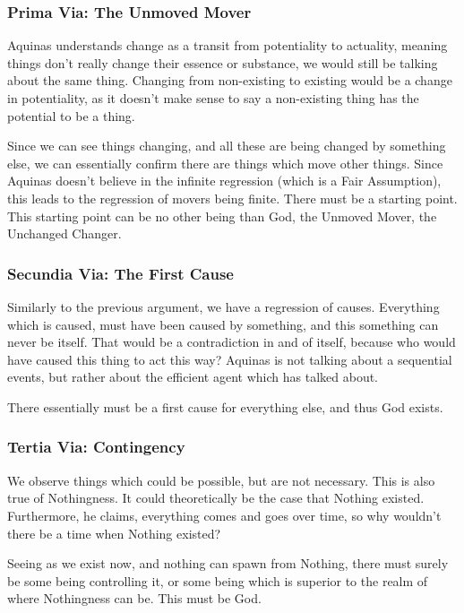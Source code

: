 \documentclass{article}
\begin{document}
	\subsubsection*{Prima Via: The Unmoved Mover}
	Aquinas understands change as a transit from potentiality to actuality, meaning things don't really change their essence or substance, we would still be talking about the same thing. Changing from non-existing to existing would be a change in potentiality, as it doesn't make sense to say a non-existing thing has the potential to be a thing.

	Since we can see things changing, and all these are being changed by something else, we can essentially confirm there are things which move other things. Since Aquinas doesn't believe in the infinite regression (which is a Fair Assumption), this leads to the regression of movers being finite. There must be a starting point. This starting point can be no other being than God, the Unmoved Mover, the Unchanged Changer.
	

	\subsubsection*{Secundia Via: The First Cause}
	Similarly to the previous argument, we have a regression of causes. Everything which is caused, must have been caused by something, and this something can never be itself. That would be a contradiction in and of itself, because who would have caused this thing to act this way? Aquinas is not talking about a sequential events, but rather about the efficient agent which \citeauthor{aristotlecauses} has talked about.

	There essentially must be a first cause for everything else, and thus God exists.


	\subsubsection*{Tertia Via: Contingency}
	We observe things which could be possible, but are not necessary. This is also true of Nothingness. It could theoretically be the case that Nothing existed. Furthermore, he claims, everything comes and goes over time, so why wouldn't there be a time when Nothing existed?
	
	Seeing as we exist now, and nothing can spawn from Nothing, there must surely be some being controlling it, or some being which is superior to the realm of where Nothingness can be. This must be God.
\end{document}
